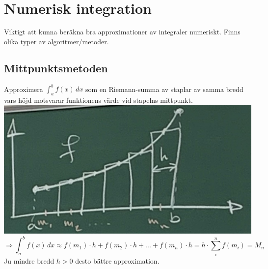 \chapter{Numerisk integration}
Viktigt att kunna beräkna bra approximationer av integraler numeriskt.
Finns olika typer av algoritmer/metoder.

\section{Mittpunktsmetoden}
Approximera $\int_a^b f(x)\, dx$ som en Riemann-summa av staplar av samma bredd vars höjd motsvarar funktionens värde vid stapelns mittpunkt.\\
\includegraphics[scale=0.1]{lessons/lesson18/imgs/img05.jpg}
\begin{equation*}
    \Rightarrow \int_a^b f(x)\, dx \approx
    f(m_1)\cdot h+f(m_2)\cdot h+...+f(m_n)\cdot h=
    h\cdot\sum_i^n f(m_i)=
    M_n
\end{equation*}
Ju mindre bredd $h>0$ desto bättre approximation.

